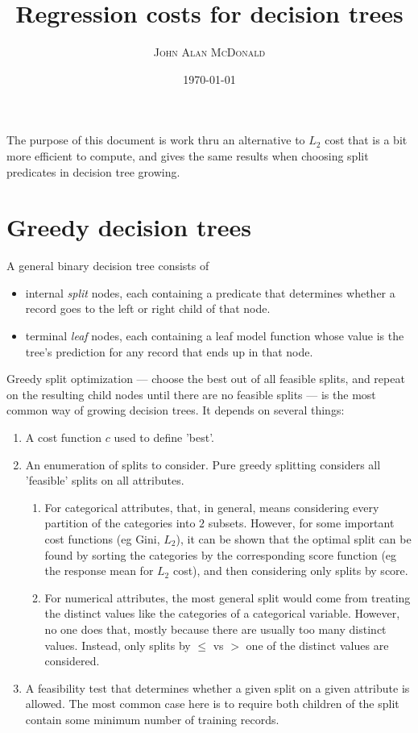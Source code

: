 \documentclass[11pt,american,usenames,dvipsnames,svgnames,x11names,table]{article}
\begin{document}
 


\title{Regression costs for decision trees}


\author{\textsc{John Alan McDonald }}


\date{\today}
\maketitle

The purpose of this document is work thru an alternative to $L_2$ cost
that is a bit more efficient to compute, and gives the same results when
choosing split predicates in decision tree growing.

\section{\label{sub:Decision-trees}Greedy decision trees}

A general binary decision tree consists of 
\begin{itemize}
\item internal \emph{split} nodes, each containing a predicate that determines
whether a record goes to the left or right child of that node.
\item terminal \emph{leaf} nodes, each containing a leaf model function
whose value is the tree's prediction for any record that ends up in
that node. 
\end{itemize}

Greedy split optimization --- choose the best out of all feasible
splits, and repeat on the resulting child nodes until there are no
feasible splits --- is the most common way of growing decision trees.
It depends on several things:
\begin{enumerate}
  \item A cost function $c$ used to define 'best'.  
  \item An enumeration of splits to consider. Pure greedy splitting
  considers all 'feasible' splits on all attributes.
  \begin{enumerate} 
    \item For categorical attributes, that, in general, means considering every 
    partition of the categories into $2$ subsets. However, for some
    important cost functions (eg Gini, $L_2$), it can be shown that the
    optimal split can be found by sorting the categories by the
    corresponding score function (eg the response mean for $L_2$ cost),
    and then considering only splits by score.
    \item For numerical attributes, the most general split would come
    from treating the distinct values like the categories of a
    categorical variable. However, no one does that, mostly because
    there are usually too many distinct values. Instead, only splits by
    $\leq$ vs $>$ one of the distinct values are considered.
\end{enumerate}
\item A feasibility test that determines whether a given split on a
given attribute is allowed. The most common case here is to require both
children of the split contain some minimum number of training records.
\end{enumerate}
\end{document}

